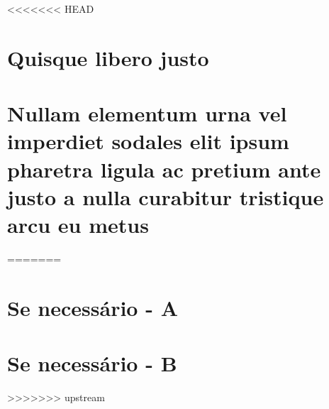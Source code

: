 \begin{apendicesenv}

<<<<<<< HEAD
\chapter{Quisque libero justo}

\lipsum[50]

\chapter{Nullam elementum urna vel imperdiet sodales elit ipsum pharetra ligula
ac pretium ante justo a nulla curabitur tristique arcu eu metus}
\lipsum[55-57]
=======
\chapter{Se necessário - A}



\chapter{Se necessário - B}

>>>>>>> upstream

\end{apendicesenv}

